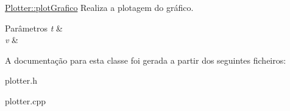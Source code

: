 \hyperlink{class_plotter_a29034483f5519c5bf9dac3ac849e0466}{Plotter\+::plot\+Grafico} Realiza a plotagem do gráfico. 


\begin{DoxyParams}{Parâmetros}
{\em t} & \\
\hline
{\em v} & \\
\hline
\end{DoxyParams}


A documentação para esta classe foi gerada a partir dos seguintes ficheiros\+:\begin{DoxyCompactItemize}
\item 
plotter.\+h\item 
plotter.\+cpp\end{DoxyCompactItemize}
